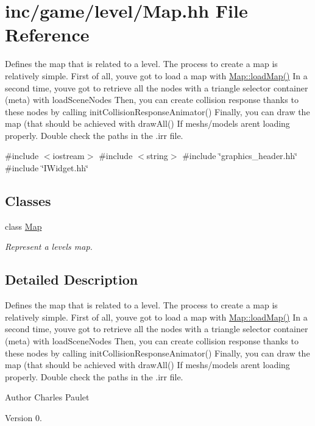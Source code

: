 \hypertarget{Map_8hh}{}\section{inc/game/level/\+Map.hh File Reference}
\label{Map_8hh}


Defines the map that is related to a level. The process to create a map is relatively simple. First of all, you\textquotesingle{}ve got to load a map with \hyperlink{classMap_a37024e6d47ca10cf83a331635fe041b7}{Map\+::load\+Map()} In a second time, you\textquotesingle{}ve got to retrieve all the nodes with a triangle selector container (meta) with load\+Scene\+Nodes Then, you can create collision response thanks to these nodes by calling init\+Collision\+Response\+Animator() Finally, you can draw the map (that should be achieved with draw\+All()  If meshs/models arent loading properly. Double check the paths in the .irr file.  


{\ttfamily \#include $<$iostream$>$}\newline
{\ttfamily \#include $<$string$>$}\newline
{\ttfamily \#include \char`\"{}graphics\+\_\+header.\+hh\char`\"{}}\newline
{\ttfamily \#include \char`\"{}I\+Widget.\+hh\char`\"{}}\newline
\subsection*{Classes}
\begin{DoxyCompactItemize}
\item 
class \hyperlink{classMap}{Map}
\begin{DoxyCompactList}\small\item\em Represent a level\textquotesingle{}s map. \end{DoxyCompactList}\end{DoxyCompactItemize}


\subsection{Detailed Description}
Defines the map that is related to a level. The process to create a map is relatively simple. First of all, you\textquotesingle{}ve got to load a map with \hyperlink{classMap_a37024e6d47ca10cf83a331635fe041b7}{Map\+::load\+Map()} In a second time, you\textquotesingle{}ve got to retrieve all the nodes with a triangle selector container (meta) with load\+Scene\+Nodes Then, you can create collision response thanks to these nodes by calling init\+Collision\+Response\+Animator() Finally, you can draw the map (that should be achieved with draw\+All()  If meshs/models arent loading properly. Double check the paths in the .irr file. 

\begin{DoxyAuthor}{Author}
Charles Paulet 
\end{DoxyAuthor}
\begin{DoxyVersion}{Version}
0. 
\end{DoxyVersion}
